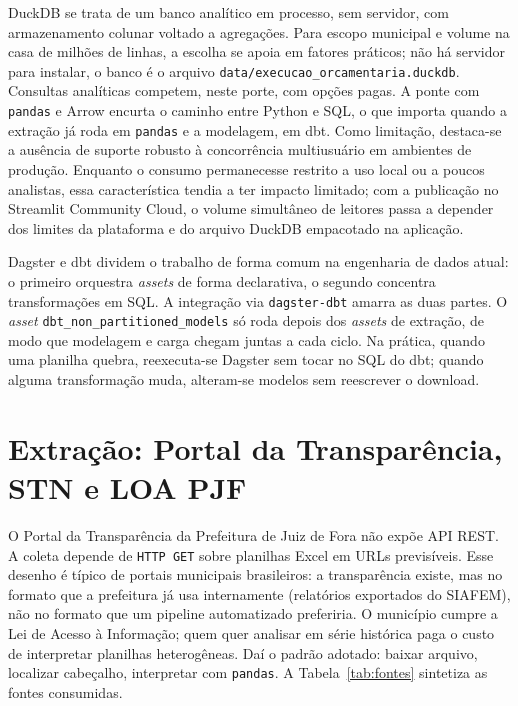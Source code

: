 DuckDB se trata de um banco analítico em processo, sem servidor, com armazenamento colunar voltado a agregações. Para escopo municipal e volume na casa de milhões de linhas, a escolha se apoia em fatores práticos; não há servidor para instalar, o banco é o arquivo \texttt{data/execucao\_orcamentaria.duckdb}. Consultas analíticas competem, neste porte, com opções pagas. A ponte com \texttt{pandas} e Arrow encurta o caminho entre Python e SQL, o que importa quando a extração já roda em \texttt{pandas} e a modelagem, em dbt. Como limitação, destaca-se a ausência de suporte robusto à concorrência multiusuário em ambientes de produção. Enquanto o consumo permanecesse restrito a uso local ou a poucos analistas, essa característica tendia a ter impacto limitado; com a publicação no Streamlit Community Cloud, o volume simultâneo de leitores passa a depender dos limites da plataforma e do arquivo DuckDB empacotado na aplicação.

Dagster e dbt dividem o trabalho de forma comum na engenharia de dados atual: o primeiro orquestra \textit{assets} de forma declarativa, o segundo concentra transformações em SQL. A integração via \texttt{dagster-dbt} amarra as duas partes. O \textit{asset} \texttt{dbt\_non\_partitioned\_models} só roda depois dos \textit{assets} de extração, de modo que modelagem e carga chegam juntas a cada ciclo. Na prática, quando uma planilha quebra, reexecuta-se Dagster sem tocar no SQL do dbt; quando alguma transformação muda, alteram-se modelos sem reescrever o download.

\section{Extração: Portal da Transparência, STN e LOA PJF}
\label{sec:extracao}

O Portal da Transparência da Prefeitura de Juiz de Fora não expõe API REST. A coleta depende de \texttt{HTTP GET} sobre planilhas Excel em URLs previsíveis. Esse desenho é típico de portais municipais brasileiros: a transparência existe, mas no formato que a prefeitura já usa internamente (relatórios exportados do SIAFEM), não no formato que um pipeline automatizado preferiria. O município cumpre a Lei de Acesso à Informação; quem quer analisar em série histórica paga o custo de interpretar planilhas heterogêneas. Daí o padrão adotado: baixar arquivo, localizar cabeçalho, interpretar com \texttt{pandas}. A Tabela~\ref{tab:fontes} sintetiza as fontes consumidas.

